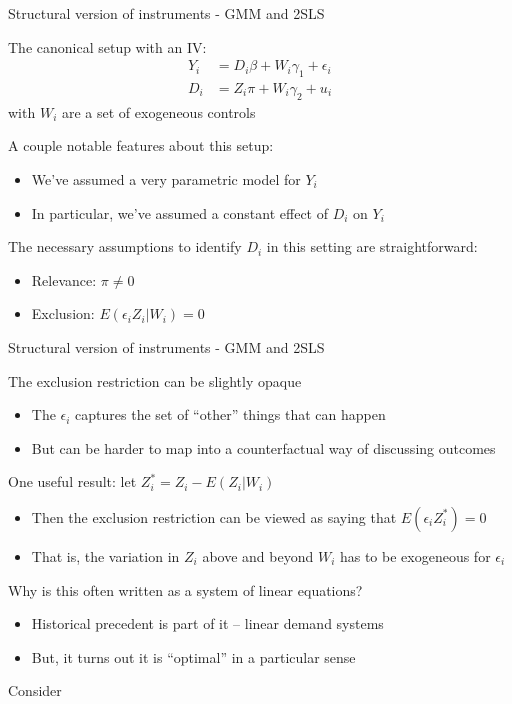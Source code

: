 \documentclass[notes,11pt, aspectratio=169]{beamer}
\newenvironment{wideitemize}{\itemize\addtolength{\itemsep}{10pt}}{\enditemize}
\begin{document}
\begin{frame}{Structural version of instruments - GMM and 2SLS}
  \begin{wideitemize}
  \item The canonical setup with an IV:
    \begin{align*}
      Y_{i} &= D_{i}\beta + W_{i}\gamma_{1} + \epsilon_{i}\\
      D_{i} &= Z_{i}\pi + W_{i}\gamma_{2} + u_{i}
    \end{align*}
    with $W_{i}$ are a set of exogeneous controls
  \item A couple notable features about this setup:
    \begin{itemize}
    \item We've assumed a very parametric model for $Y_{i}$
    \item In particular, we've assumed a constant effect of $D_{i}$ on $Y_{i}$
    \end{itemize}
  \item The necessary assumptions to identify $D_{i}$ in this setting are straightforward:
    \begin{itemize}
    \item Relevance: $\pi \not = 0$
    \item Exclusion: $E(\epsilon_{i}Z_{i} | W_{i}) = 0$
    \end{itemize}
  \end{wideitemize}
\end{frame}

\begin{frame}{Structural version of instruments - GMM and 2SLS}
  \begin{wideitemize}
  \item The exclusion restriction can be slightly opaque
    \begin{itemize}
    \item The $\epsilon_{i}$ captures the set of ``other'' things that can happen
    \item But can be harder to map into a counterfactual way of discussing outcomes
    \end{itemize}
  \item One useful result: let $Z_{i}^{*} = Z_{i} - E(Z_{i} | W_{i})$
    \begin{itemize}
    \item Then the exclusion restriction can be viewed as saying that
      $E(\epsilon_{i}Z_{i}^{*}) = 0$
    \item That is, the variation in $Z_{i}$ above and beyond $W_{i}$
      has to be exogeneous for $\epsilon_{i}$
    \end{itemize}
  \item Why is this often written as a system of linear equations?
    \begin{itemize}
    \item Historical precedent is part of it -- linear demand systems
    \item But, it turns out it is ``optimal'' in a particular sense
    \end{itemize}
  \item Consider 
  \end{wideitemize}
\end{frame}
\end{document}
